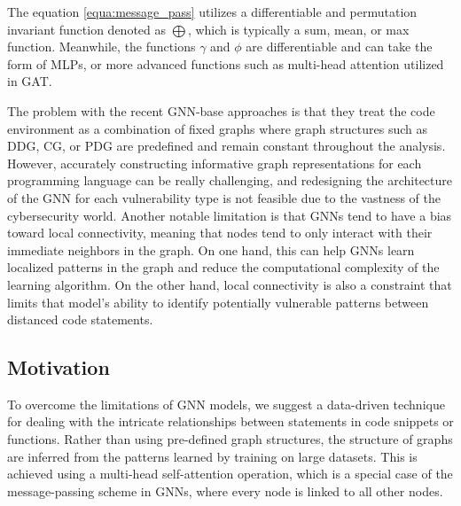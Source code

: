 \documentclass{ieeeaccess}
\begin{document}
\par The equation \ref{equa:message_pass} utilizes a differentiable and permutation invariant function denoted as $\bigoplus$, which is typically a sum, mean, or max function. Meanwhile, the functions $\gamma$ and $\phi$ are differentiable and can take the form of MLPs, or more advanced functions such as multi-head attention utilized in GAT\cite{GAT}. 

\par The problem with the recent GNN-base approaches\cite{devign, Linevd, Are, MVD} is that they treat the code environment as a combination of fixed graphs where graph structures such as DDG, CG, or PDG are predefined and remain constant throughout the analysis. However, accurately constructing informative graph representations for each programming language can be really challenging, and redesigning the architecture of the GNN for each vulnerability type is not feasible due to the vastness of the cybersecurity world. Another notable limitation is that GNNs tend to have a bias toward local connectivity, meaning that nodes tend to only interact with their immediate neighbors in the graph. On one hand, this can help GNNs learn localized patterns in the graph and reduce the computational complexity of the learning algorithm. On the other hand, local connectivity is also a constraint that limits that model's ability to identify potentially vulnerable patterns between distanced code statements.

\subsection{Motivation} \label{sec:motivation}

\par   To overcome the limitations of GNN models, we suggest a data-driven technique for dealing with the intricate relationships between statements in code snippets or functions. Rather than using pre-defined graph structures, the structure of graphs are inferred from the patterns learned by training on large datasets. This is achieved using a multi-head self-attention operation, which is a special  case of  the message-passing scheme in GNNs, where every node is linked to all other nodes.
\end{document}
